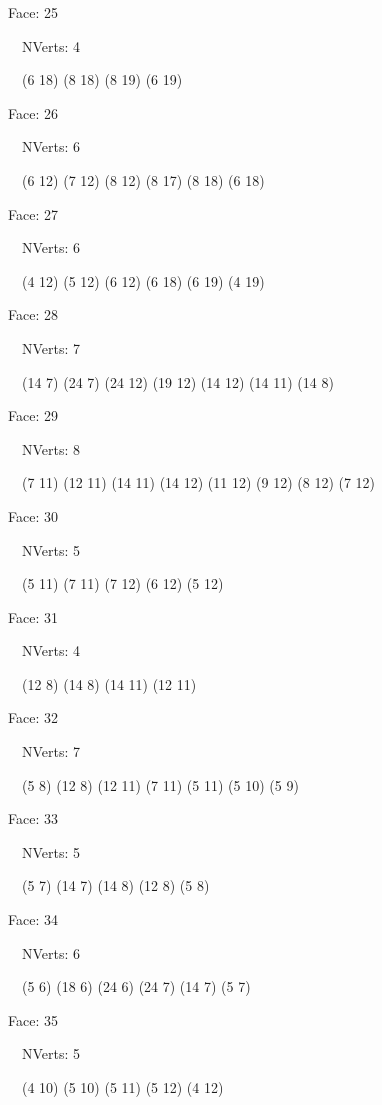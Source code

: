 \documentclass{article}
\begin{document}
{\footnotesize 

Face: 25

\   \    NVerts: 4

 \   \   (6 18) (8 18) (8 19) (6 19)}

{\footnotesize 

Face: 26

\   \    NVerts: 6

 \   \   (6 12) (7 12) (8 12) (8 17) (8 18) (6 18)}

{\footnotesize 

Face: 27

\   \    NVerts: 6

 \   \   (4 12) (5 12) (6 12) (6 18) (6 19) (4 19)}

{\footnotesize 

Face: 28

\   \    NVerts: 7

 \   \   (14 7) (24 7) (24 12) (19 12) (14 12) (14 11) (14 8)}

{\footnotesize 

Face: 29

\   \    NVerts: 8

 \   \   (7 11) (12 11) (14 11) (14 12) (11 12) (9 12) (8 12) (7 12)}

{\footnotesize 

Face: 30

\   \    NVerts: 5

 \   \   (5 11) (7 11) (7 12) (6 12) (5 12)}

{\footnotesize 

Face: 31

\   \    NVerts: 4

 \   \   (12 8) (14 8) (14 11) (12 11)}

{\footnotesize 

Face: 32

\   \    NVerts: 7

 \   \   (5 8) (12 8) (12 11) (7 11) (5 11) (5 10) (5 9)}

{\footnotesize 

Face: 33

\   \    NVerts: 5

 \   \   (5 7) (14 7) (14 8) (12 8) (5 8)}

{\footnotesize 

Face: 34

\   \    NVerts: 6

 \   \   (5 6) (18 6) (24 6) (24 7) (14 7) (5 7)}

{\footnotesize 

Face: 35

\   \    NVerts: 5

 \   \   (4 10) (5 10) (5 11) (5 12) (4 12)}
\end{document}
